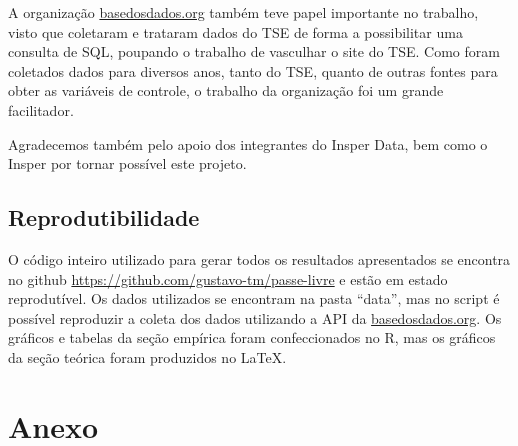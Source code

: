 A organização \url{basedosdados.org} também teve papel importante no trabalho, visto que coletaram e trataram dados do TSE de forma a possibilitar uma consulta de SQL, poupando o trabalho de vasculhar o site do TSE. Como foram coletados dados para diversos anos, tanto do TSE, quanto de outras fontes para obter as variáveis de controle, o trabalho da organização foi um grande facilitador. 

Agradecemos também pelo apoio dos integrantes do Insper Data, bem como o Insper por tornar possível este projeto.

\subsection{Reprodutibilidade}

O código inteiro utilizado para gerar todos os resultados apresentados se encontra no github \url{https://github.com/gustavo-tm/passe-livre} e estão em estado reprodutível. Os dados utilizados se encontram na pasta ``data'', mas no script é possível reproduzir a coleta dos dados utilizando a API da \url{basedosdados.org}. Os gráficos e tabelas da seção empírica foram confeccionados no R, mas os gráficos da seção teórica foram produzidos no \LaTeX . 


\clearpage
\section{Anexo}
\label{sec_anex}



